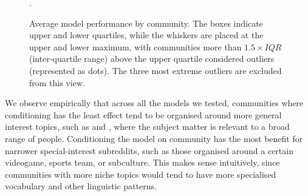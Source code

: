 \documentclass[11pt]{article}
\begin{document}
\newcommand{\modelboxplot}[3]{
  \addplot+[
    boxplot={draw position=#3, box extend=0.3}, 
    draw=#2, mark=*, mark options={fill=#2, scale=0.5}, solid, fill=#2!10,
    area legend] 
    table [y=#1] {floats/comm.csv};
}
\begin{figure}[t]
\caption{
  Average model performance by community.
The boxes indicate upper and lower quartiles, while the whiskers are placed at the upper and lower maximum, with communities more than $1.5\times IQR$ (inter-quartile range) above the upper quartile considered outliers (represented as dots). The three most extreme outliers are excluded from this view.}.%
\label{fig:comm-stratified-box}
\end{figure}

We observe empirically that across all the models we
tested, communities where conditioning has the least effect tend to be
organised around more general interest topics, such as 
 and , where the subject
matter is relevant to a broad range of people.  Conditioning the model
on community has the most benefit for narrower special-interest
subreddits, such as those organised around a certain videogame, sports
team, or subculture.  This makes sense intuitively, since communities
with more niche topics would tend to have more specialised vocabulary
and other linguistic patterns.
\end{document}
